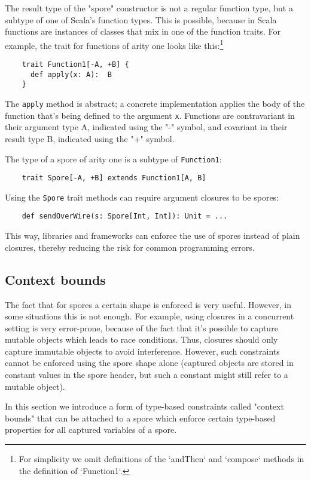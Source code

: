 \documentclass[a4paper,twoside]{article}
\begin{document}
The result type of the "spore" constructor is not a regular function type, but a subtype of one of Scala's function types. This is possible, because in Scala functions are instances of classes that mix in one of the function traits. For example, the trait for functions of arity one looks like this:\footnote{For simplicity we omit definitions of the `andThen` and `compose` methods in the definition of `Function1`.}

\begin{verbatim}
    trait Function1[-A, +B] {
      def apply(x: A):  B
    }
\end{verbatim}
\noindent
The \verb|apply| method is abstract; a concrete implementation applies the body of the function that's being defined to the argument \verb|x|. Functions are contravariant in their argument type A, indicated using the "-" symbol, and covariant in their result type B, indicated using the "+" symbol.

The type of a spore of arity one is a subtype of \verb|Function1|:

\begin{verbatim}
    trait Spore[-A, +B] extends Function1[A, B]
\end{verbatim}
\noindent
Using the \verb|Spore| trait methods can require argument closures to be spores:

\begin{verbatim}
    def sendOverWire(s: Spore[Int, Int]): Unit = ...
\end{verbatim}
\noindent
This way, libraries and frameworks can enforce the use of spores instead of plain closures, thereby reducing the risk for common programming errors.

\subsection{Context bounds}

The fact that for spores a certain shape is enforced is very useful. However, in some situations this is not enough. For example, using closures in a concurrent setting is very error-prone, because of the fact that it's possible to capture mutable objects which leads to race conditions. Thus, closures should only capture immutable objects to avoid interference. However, such constraints cannot be enforced using the spore shape alone (captured objects are stored in constant values in the spore header, but such a constant might still refer to a mutable object).

In this section we introduce a form of type-based constraints called "context bounds" that can be attached to a spore which enforce certain type-based properties for all captured variables of a spore.
\end{document}
